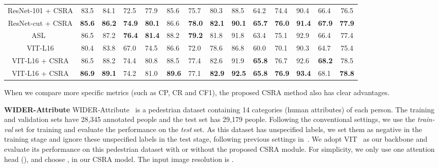 \documentclass[10pt,twocolumn,letterpaper]{article}
\begin{document}
\begin{table*}
\begin{tabular}{c|c|clllll | lllllc}
		ResNet-101 + CSRA          & 83.5          & 84.1                     & 72.5                      & 77.9          & 85.6          & 75.7          & 80.3          & 88.5          & 64.2          & 74.4          & 90.4          & 66.4          & 76.5          \\
		ResNet-cut + CSRA          & \textbf{85.6} & \textbf{86.2}            & \textbf{74.9}             & \textbf{80.1} & 86.6          & \textbf{78.0} & \textbf{82.1} & \textbf{90.1} & \textbf{65.7} & \textbf{76.0} & \textbf{91.4} & \textbf{67.9} & \textbf{77.9} \\
		\hline\hline
		ASL~\cite{ASL_2020_arxiv}    & 86.5          & 87.2                     & \textbf{76.4}            & \textbf{81.4}     & 88.2       & \textbf{79.2}          & 81.8          & 91.8          & 63.4          & 75.1          & 92.9       & 66.4          & 77.4          \\
		VIT-L16                      & 80.4          & 83.8                     & 67.0                      & 74.5          & 86.6          & 72.0          & 78.6          & 86.8          & 60.0          & 70.1          & 90.3          & 64.7          & 75.4          \\
		VIT-L16 + CSRA           & 86.5 & 88.2            & 74.4                      & 80.8          & 88.5 & 77.4          & 82.6 & 91.9 & \textbf{65.8} & 76.7 & 92.6          & \textbf{68.2} & 78.5 \\
		VIT-L16 + CSRA           & \textbf{86.9} & \textbf{89.1}            & 74.2                      & 81.0          & \textbf{89.6} & 77.1          & \textbf{82.9} & \textbf{92.5} & \textbf{65.8} & \textbf{76.9} & \textbf{93.4}          & 68.1 & \textbf{78.8} \\\hline
	\end{tabular}
\end{table*}

When we compare more specific metrics (such as CP, CR and CF1), the proposed CSRA method also has clear advantages.

\vspace{6pt}\noindent\textbf{WIDER-Attribute} WIDER-Attribute~\cite{Wider} is a pedestrian dataset containing 14 categories (human attributes) of each person. The training and validation sets have 28,345 annotated people and the test set has 29,179 people. Following the conventional settings, we use the \emph{train-val} set for training and evaluate the performance on the \emph{test} set. As this dataset has unspecified labels, we set them as negative in the training stage and ignore these unspecified labels in the test stage, following previous settings in~\cite{2017_CVPR_SRN}. We adopt VIT~\cite{VIT} as our backbone and evaluate its performance on this pedestrian dataset with or without the proposed CSRA module. For simplicity, we only use one attention head (), and choose ,  in our CSRA model. The input image resolution is .
\end{document}
